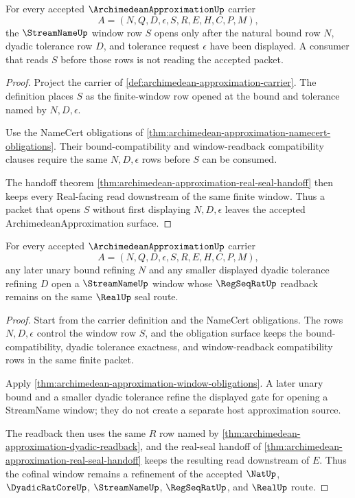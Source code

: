 \begin{theorem}
\label{thm:archimedean-approximation-window-obligations}
For every accepted $\ArchimedeanApproximationUp$ carrier
$$
A=(N,Q,D,\epsilon,S,R,E,H,C,P,M),
$$
the $\StreamNameUp$ window row $S$ opens only after the natural bound row $N$, dyadic tolerance row $D$, and tolerance request $\epsilon$ have been displayed. A consumer that reads $S$ before those rows is not reading the accepted packet.
\end{theorem}
\begin{proof}
Project the carrier of \autoref{def:archimedean-approximation-carrier}. The definition places $S$ as the finite-window row opened at the bound and tolerance named by $N,D,\epsilon$.

Use the NameCert obligations of \autoref{thm:archimedean-approximation-namecert-obligations}. Their bound-compatibility and window-readback compatibility clauses require the same $N,D,\epsilon$ rows before $S$ can be consumed.

The handoff theorem \autoref{thm:archimedean-approximation-real-seal-handoff} then keeps every Real-facing read downstream of the same finite window. Thus a packet that opens $S$ without first displaying $N,D,\epsilon$ leaves the accepted ArchimedeanApproximation surface.
\end{proof}

\begin{theorem}
\label{thm:archimedean-approximation-dyadic-cofinal-window}
For every accepted $\ArchimedeanApproximationUp$ carrier
$$
A=(N,Q,D,\epsilon,S,R,E,H,C,P,M),
$$
any later unary bound refining $N$ and any smaller displayed dyadic tolerance refining $D$ open a $\StreamNameUp$ window whose $\RegSeqRatUp$ readback remains on the same $\RealUp$ seal route.
\end{theorem}
\begin{proof}
Start from the carrier definition and the NameCert obligations. The rows $N,D,\epsilon$ control the window row $S$, and the obligation surface keeps the bound-compatibility, dyadic tolerance exactness, and window-readback compatibility rows in the same finite packet.

Apply \autoref{thm:archimedean-approximation-window-obligations}. A later unary bound and a smaller dyadic tolerance refine the displayed gate for opening a StreamName window; they do not create a separate host approximation source.

The readback then uses the same $R$ row named by \autoref{thm:archimedean-approximation-dyadic-readback}, and the real-seal handoff of \autoref{thm:archimedean-approximation-real-seal-handoff} keeps the resulting read downstream of $E$. Thus the cofinal window remains a refinement of the accepted $\NatUp$, $\DyadicRatCoreUp$, $\StreamNameUp$, $\RegSeqRatUp$, and $\RealUp$ route.
\end{proof}

